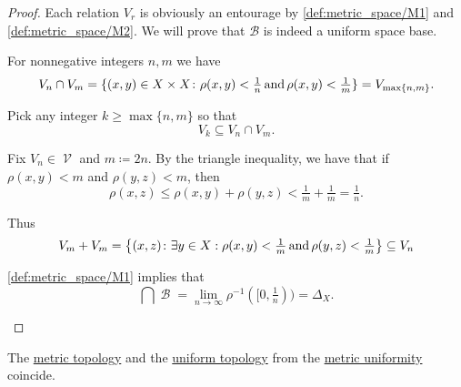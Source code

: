 \begin{proof}
  Each relation \( V_r \) is obviously an entourage by \ref{def:metric_space/M1} and \ref{def:metric_space/M2}. We will prove that \( \mathcal{B} \) is indeed a uniform space base.

  \begin{RefList}
     For nonnegative integers \( n, m \) we have
    \begin{equation*}
      V_n \cap V_m
      =
      \{ (x, y) \in X \times X \colon \rho(x, y) < \tfrac 1 n \mathop{\text{and}} \rho(x, y) < \tfrac 1 m \}
      =
      V_{\max\{ n, m \}}.
    \end{equation*}

    Pick any integer \( k \geq \max\{ n, m \} \) so that
    \begin{equation*}
      V_k \subseteq V_n \cap V_m.
    \end{equation*}

     Fix \( V_n \in \mscrV \) and \( m \coloneqq 2n \). By the triangle inequality, we have that if \( \rho(x, y) < m \) and \( \rho(y, z) < m \), then
    \begin{equation*}
      \rho(x, z) \leq \rho(x, y) + \rho(y, z) < \tfrac 1 m + \tfrac 1 m = \tfrac 1 n.
    \end{equation*}

    Thus
    \begin{equation*}
      V_m + V_m
      =
      \left\{ (x, z) \colon \exists y \in X: \rho(x, y) < \tfrac 1 m \mathop{\text{and}} \rho(y, z) < \tfrac 1 m \right\}
      \subseteq
      V_n
    \end{equation*}

     \ref{def:metric_space/M1} implies that
    \begin{equation*}
      \bigcap \mscrB = \lim_{n \to \infty} \rho^{-1}([0, \tfrac 1 n)) = \Delta_X.
    \end{equation*}
  \end{RefList}
\end{proof}

\begin{proposition}\label{thm:metric_topology_coincides_with_uniform_topology}
  The \hyperref[def:metric_topology]{metric topology} and the \hyperref[def:uniform_topology]{uniform topology} from the \hyperref[def:metric_uniformity]{metric uniformity} coincide.
\end{proposition}


